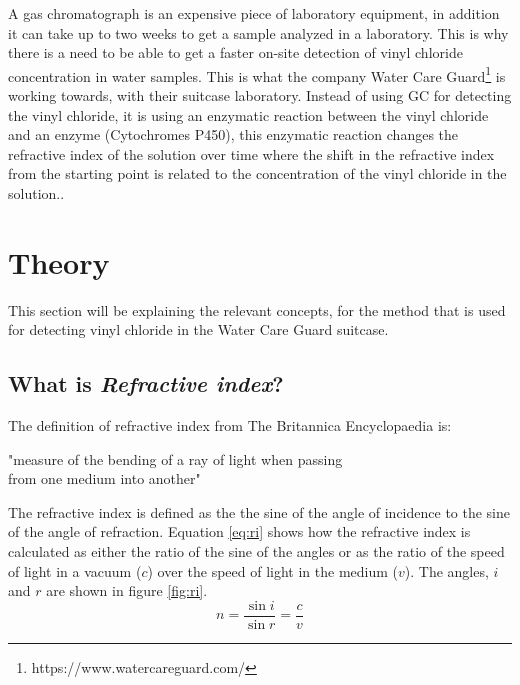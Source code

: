 \documentclass{article}
\begin{document}
A gas chromatograph is an expensive piece of laboratory equipment\cite{gc_cost_axion}, in addition it can take up to two weeks to get a sample analyzed in a laboratory\cite{water_analysis_cwt}.
This is why there is a need to be able to get a faster on-site detection of vinyl chloride concentration in water samples.
This is what the company Water Care Guard\footnote{https://www.watercareguard.com/} is working towards, with their suitcase laboratory.
Instead of using GC for detecting the vinyl chloride, it is using an enzymatic reaction between the vinyl chloride and an enzyme (Cytochromes P450), this enzymatic reaction changes the refractive index of the solution over time where the shift in the refractive index from the starting point is related to the concentration of the vinyl chloride in the solution.\cite{roana_vc_ri}\cite{Ghanayem2007-nb}.

\newpage
\section{Theory}
This section will be explaining the relevant concepts, for the method that is used for detecting vinyl chloride in the Water Care Guard suitcase.

\subsection{What is \textit{Refractive index}?}
The definition of refractive index from The Britannica Encyclopaedia is:
\begin{center}
"measure of the bending of a ray of light when passing\\from one medium into another"\cite{ri_britannica}
\end{center}

The refractive index is defined as the the sine of the angle of incidence to the sine of the angle of refraction.\cite{ri_britannica}
Equation \ref{eq:ri} shows how the refractive index is calculated as either the ratio of the sine of the angles or as the ratio of the speed of light in a vacuum ($c$) over the speed of light in the medium ($v$).\cite{ri_mettler_toledo}
The angles, $i$ and $r$ are shown in figure \ref{fig:ri}.
\begin{equation}\label{eq:ri}
    n = \frac{\sin{i}}{\sin{r}} = \frac{c}{v}
\end{equation}
\end{document}
